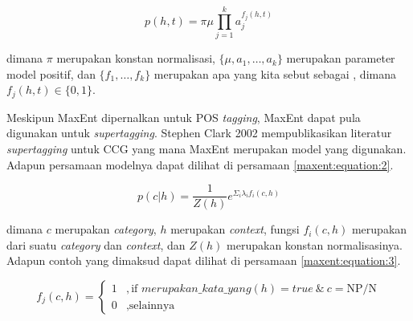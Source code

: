 \begin{equation}\label{maxent:equation:1}
  p(h, t) = \pi\mu\prod_{j = 1}^{k} a_{j}^{f_{j}(h, t)}
\end{equation}

\noindent
dimana $\pi$ merupakan konstan normalisasi,
$\{\mu, a_1, \dots, a_k\}$ merupakan parameter model positif,
dan $\{f_1, \dots, f_k\}$ merupakan apa yang kita sebut sebagai
,
dimana $f_j(h, t) \in \{0, 1\}$.

Meskipun MaxEnt dipernalkan untuk POS \textit{tagging},
MaxEnt dapat pula digunakan untuk \textit{supertagging}.
Stephen Clark 2002 mempublikasikan literatur \textit{supertagging} untuk CCG yang
mana MaxEnt merupakan model yang digunakan.
Adapun persamaan modelnya dapat dilihat di persamaan \ref{maxent:equation:2}.

\begin{equation}\label{maxent:equation:2}
  p(c|h) = \frac{1}{Z(h)} e^{\Sigma_i \lambda_if_i(c, h)}
\end{equation}

\noindent
dimana $c$ merupakan \textit{category}, $h$ merupakan \textit{context},
fungsi $f_i(c, h)$ merupakan  dari suatu
\textit{category} dan \textit{context}, dan $Z(h)$ merupakan konstan normalisasinya.
Adapun contoh  yang dimaksud dapat dilihat di persamaan
\ref{maxent:equation:3}.

\begin{equation}\label{maxent:equation:3}
  f_j(c, h) =
  \begin{cases}
    1 &, \text{if } merupakan\_kata\_yang(h) = true\ \&\ c = \text{NP/N}\\
    0 &, \text{selainnya}
  \end{cases}
\end{equation}
